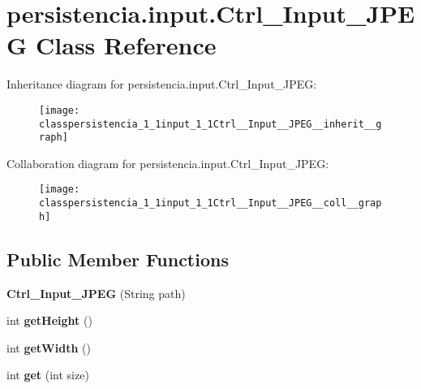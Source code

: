 \hypertarget{classpersistencia_1_1input_1_1Ctrl__Input__JPEG}{}\section{persistencia.\+input.\+Ctrl\+\_\+\+Input\+\_\+\+J\+P\+EG Class Reference}
\label{classpersistencia_1_1input_1_1Ctrl__Input__JPEG}


Inheritance diagram for persistencia.\+input.\+Ctrl\+\_\+\+Input\+\_\+\+J\+P\+EG\+:\nopagebreak
\begin{figure}[H]
\begin{center}
\leavevmode
\texttt{[image: classpersistencia\_1\_1input\_1\_1Ctrl\_\_Input\_\_JPEG\_\_inherit\_\_graph]}
\end{center}
\end{figure}


Collaboration diagram for persistencia.\+input.\+Ctrl\+\_\+\+Input\+\_\+\+J\+P\+EG\+:\nopagebreak
\begin{figure}[H]
\begin{center}
\leavevmode
\texttt{[image: classpersistencia\_1\_1input\_1\_1Ctrl\_\_Input\_\_JPEG\_\_coll\_\_graph]}
\end{center}
\end{figure}
\subsection*{Public Member Functions}
\begin{DoxyCompactItemize}
\item 
\mbox{\label{classpersistencia_1_1input_1_1Ctrl__Input__JPEG_aa7d81dfa6240a7ee82e5188fc2600c58}} 
{\bfseries Ctrl\+\_\+\+Input\+\_\+\+J\+P\+EG} (String path)
\item 
\mbox{\label{classpersistencia_1_1input_1_1Ctrl__Input__JPEG_a16212709871daadfd0ddf345f84627af}} 
int {\bfseries get\+Height} ()
\item 
\mbox{\label{classpersistencia_1_1input_1_1Ctrl__Input__JPEG_ad9b46004c4c9a2b425fbc84fe1207aea}} 
int {\bfseries get\+Width} ()
\item 
\mbox{\label{classpersistencia_1_1input_1_1Ctrl__Input__JPEG_a3894c1b536caad56b58e993ad5db6b11}} 
int {\bfseries get} (int size)
\end{DoxyCompactItemize}
